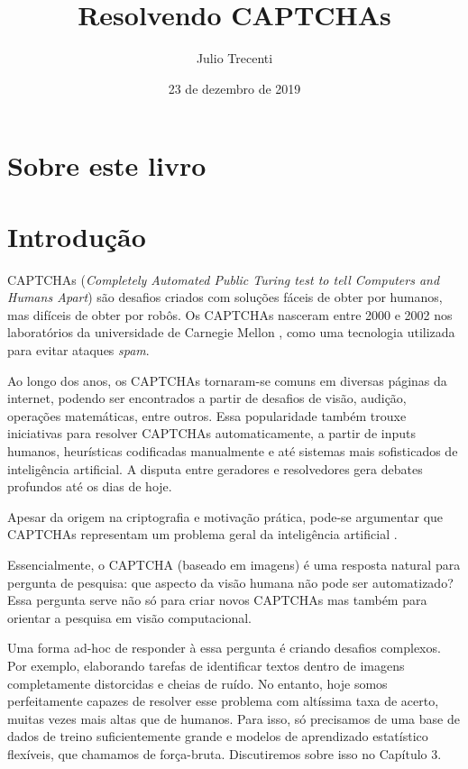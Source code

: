 \documentclass[12pt,]{report}
\title{Resolvendo CAPTCHAs}
\author{Julio Trecenti}
\date{23 de dezembro de 2019}
\begin{document}
\maketitle

{
\hypersetup{linkcolor=}
\setcounter{tocdepth}{2}
\tableofcontents
}
\listoftables
\listoffigures
\hypertarget{sobre-este-livro}{%
\chapter{Sobre este livro}\label{sobre-este-livro}}

\hypertarget{introduuxe7uxe3o}{%
\chapter{Introdução}\label{introduuxe7uxe3o}}

CAPTCHAs (\emph{Completely Automated Public Turing test to tell Computers and Humans Apart}) são desafios criados com soluções fáceis de obter por humanos, mas difíceis de obter por robôs. Os CAPTCHAs nasceram entre 2000 e 2002 nos laboratórios da universidade de Carnegie Mellon \citep{von2002telling}, como uma tecnologia utilizada para evitar ataques \emph{spam}.

Ao longo dos anos, os CAPTCHAs tornaram-se comuns em diversas páginas da internet, podendo ser encontrados a partir de desafios de visão, audição, operações matemáticas, entre outros. Essa popularidade também trouxe iniciativas para resolver CAPTCHAs automaticamente, a partir de inputs humanos, heurísticas codificadas manualmente e até sistemas mais sofisticados de inteligência artificial. A disputa entre geradores e resolvedores gera debates profundos até os dias de hoje.

Apesar da origem na criptografia e motivação prática, pode-se argumentar que CAPTCHAs representam um problema geral da inteligência artificial \citep{george2017generative}.

Essencialmente, o CAPTCHA (baseado em imagens) é uma resposta natural para pergunta de pesquisa: que aspecto da visão humana não pode ser automatizado? Essa pergunta serve não só para criar novos CAPTCHAs mas também para orientar a pesquisa em visão computacional.

Uma forma ad-hoc de responder à essa pergunta é criando desafios complexos. Por exemplo, elaborando tarefas de identificar textos dentro de imagens completamente distorcidas e cheias de ruído. No entanto, hoje somos perfeitamente capazes de resolver esse problema com altíssima taxa de acerto, muitas vezes mais altas que de humanos. Para isso, só precisamos de uma base de dados de treino suficientemente grande e modelos de aprendizado estatístico flexíveis, que chamamos de força-bruta. Discutiremos sobre isso no Capítulo 3.
\end{document}
